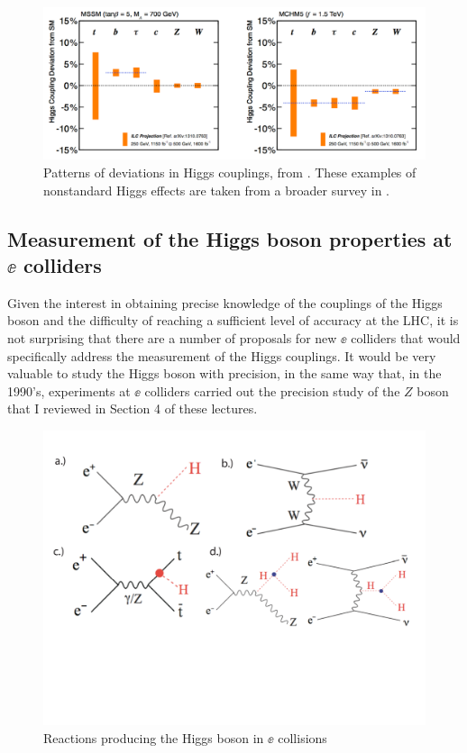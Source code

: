 \documentclass[12pt]{article}
\begin{document}
\begin{figure}
\begin{center}
\includegraphics[width=0.90\hsize]{Kanemura.pdf}
\end{center}
\caption{Patterns of deviations in Higgs couplings, from
  \cite{ILCcase}.   These examples of nonstandard Higgs effects are
  taken from a broader survey in \cite{Kanemura}.}
\label{fig:Kanemura}
\end{figure}


\subsection{Measurement of the Higgs boson properties at $\ee$
  colliders}

Given the interest in obtaining precise knowledge of the couplings of
the Higgs boson and the difficulty of reaching a sufficient level of
accuracy at the LHC, it is not surprising that there are a number of
proposals
for new $\ee$ colliders that would specifically address the
measurement of the Higgs couplings.   It would be very valuable to
study the Higgs boson with precision, in the same way that, in the
1990's, experiments at $\ee$ colliders carried out the precision study of
the $Z$ boson that I reviewed in Section 4 of these lectures.




\begin{figure}
\begin{center}
\includegraphics[width=0.70\hsize]{eeHiggsreactions.pdf}
\end{center}
\caption{Reactions producing the Higgs boson in $\ee$ collisions}
\label{fig:Hprocessesee}
\end{figure}
\end{document}

